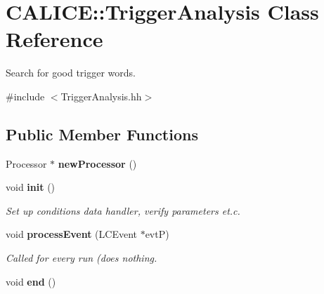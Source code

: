 \section{CALICE::TriggerAnalysis Class Reference}
\label{classCALICE_1_1TriggerAnalysis}


Search for good trigger words.  


{\ttfamily \#include $<$TriggerAnalysis.hh$>$}\subsection*{Public Member Functions}
\begin{DoxyCompactItemize}
\item 
Processor $\ast$ {\bfseries newProcessor} ()\label{classCALICE_1_1TriggerAnalysis_ab21f54611eb9ddd3ad43fc21503d4e33}

\item 
void {\bf init} ()\label{classCALICE_1_1TriggerAnalysis_a7a51af68dccbac1354f5246cdcea5c83}

\begin{DoxyCompactList}\small\item\em Set up conditions data handler, verify parameters et.c. \item\end{DoxyCompactList}\item 
void {\bf processEvent} (LCEvent $\ast$evtP)
\begin{DoxyCompactList}\small\item\em Called for every run (does nothing. \item\end{DoxyCompactList}\item 
void {\bfseries end} ()\label{classCALICE_1_1TriggerAnalysis_a3dc3f0ae7a921facafc54fa4e271f664}

\end{DoxyCompactItemize}
